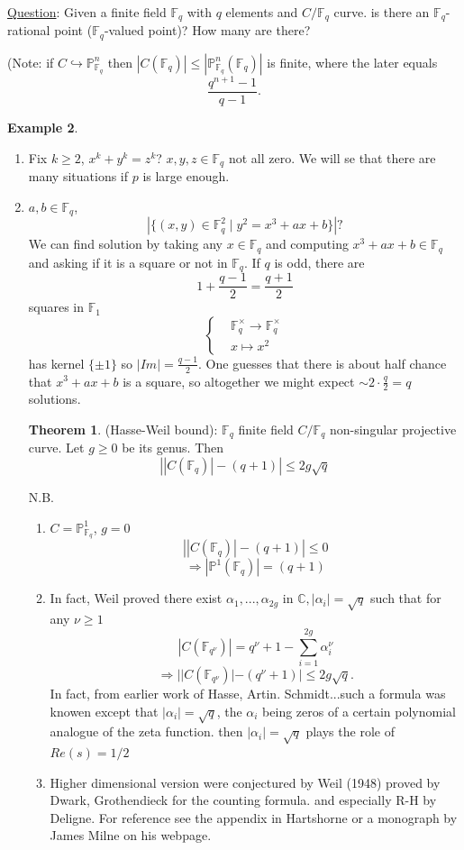 \documentclass[11pt]{article}
\theoremstyle{definition}
\newtheorem{thm}{Theorem}[section]
\newtheorem{ex}[thm]{Example}
\newcommand{\proj}{\mathbb P}
\newcommand{\cplx}{\mathbb C}
\newcommand{\bbf}{\mathbb F}
\newcommand{\Lrta}{\Longrightarrow}
\newcommand{\lrta}{\longrightarrow}
\newcommand{\inj}{\hookrightarrow}
\begin{document}
\underline{Question}: Given a finite field $\bbf_q$  with $q$ elements and $C/\bbf_q$ curve. is there an $\bbf_q$-rational point ($\bbf_q$-valued point)? How many are there?

(Note: if $C\inj \proj^n_{\bbf_q}$ then $|C(\bbf_q)|\leq |\proj^n_{\bbf_q}(\bbf_q)|$ is finite, where the later equals
$$
\frac{q^{n+1}-1}{q-1}.
$$
\begin{ex}\ 
\begin{enumerate}[label=(\arabic*)]
\item
Fix $k\geq 2$, $x^k+y^k=z^k$? $x,y,z\in \bbf_q$ not all zero.
 We will se that there are many situations if $p$ is large enough.
 \item $a,b\in \bbf_q$, 
 $$
 \left|\{(x,y)\in \bbf_q^2\mid y^2=x^3+ax+b\}\right|?
 $$
We can find solution by taking any $x\in \bbf_q$ and computing $x^3+ax+b\in\bbf_q$ and asking if it is a square or not in $\bbf_q$. If $q$ is odd, there are
$$
1+\frac{q-1}{2}=\frac{q+1}{2}
$$
squares in $\bbf_1$
$$
\left\{
\begin{aligned}
& \bbf_q^\times\lrta\bbf_q^\times\\
& x\longmapsto x^2
\end{aligned}\right.
$$
has kernel $\{\pm 1\}$ so $|Im|=\frac{q-1}{2}$. One guesses that there is about half chance that $x^3+ax+b$ is a square, so altogether we might expect $\sim 2\cdot \frac{q}{2}=q$ solutions.

\begin{thm}
(Hasse-Weil bound): $\bbf_q$ finite field $C/\bbf_q$ non-singular projective curve. Let $g\geq 0$ be its genus. Then $$\left||C(\bbf_q)|-(q+1)\right|\leq 2g \sqrt{q}$$
\end{thm}

N.B. 
\begin{enumerate}
\item 
$C=\proj^1_{\bbf_q}$, $g=0$
$$
\left||C(\bbf_q)|-(q+1)\right|\leq 0
$$
$$
\Lrta |\proj^1(\bbf_q)|=(q+1)
$$
\item In fact,  Weil proved there exist $\alpha_1,...,\alpha_{2g}$ in $\cplx, |\alpha_i|=\sqrt{q}$ such that for any $\nu\geq 1$
$$
|C(\bbf_{q^\nu})|=q^\nu+1-\sum_{i=1}^{2g}\alpha_i^\nu
$$
$$
\Lrta ||C(\bbf_{q^\nu})|-(q^\nu+1)|\leq 2g \sqrt{q}.
$$
In fact, from earlier work of Hasse, Artin. Schmidt...such a formula was  knowen except that $|\alpha_i|=\sqrt{q}$, the $\alpha_i$ being zeros of a certain polynomial analogue of the zeta function. then $|\alpha_i|=\sqrt{q}$ plays the role of $Re(s)=1/2$
\item Higher dimensional version were conjectured by Weil (1948) proved by Dwark, Grothendieck for the counting formula. and especially R-H by Deligne. For reference see the appendix in Hartshorne or a monograph by James Milne on his webpage.
\end{enumerate}
\end{enumerate}
\end{ex}
\end{document}
